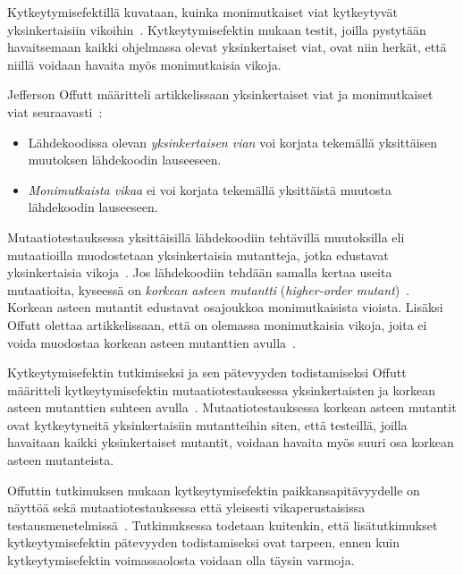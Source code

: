 \documentclass[finnish, grading]{tktltiki2}
\theoremstyle{definition}
\theoremstyle{remark}
\begin{document}
Kytkeytymisefektillä kuvataan, kuinka monimutkaiset viat kytkeytyvät yksinkertaisiin vikoihin~\cite[s. 35]{DeMillo:Lipton:Sayward:1978}. Kytkeytymisefektin mukaan testit, joilla pystytään havaitsemaan kaikki ohjelmassa olevat yksinkertaiset viat, ovat niin herkät, että niillä voidaan havaita myös monimutkaisia vikoja. 

Jefferson Offutt määritteli artikkelissaan yksinkertaiset viat ja monimutkaiset viat seuraavasti~\cite[s. 6]{Offutt:1992:Coupling}:
\begin{itemize}
  \item Lähdekoodissa olevan \textit{yksinkertaisen vian} voi korjata tekemällä yksittäisen muutoksen lähdekoodin lauseeseen.
  \item \textit{Monimutkaista vikaa} ei voi korjata tekemällä yksittäistä muutosta lähdekoodin lauseeseen.
\end{itemize}
Mutaatiotestauksessa yksittäisillä lähdekoodiin tehtävillä muutoksilla eli mutaatioilla muodostetaan yksinkertaisia mutantteja, jotka edustavat yksinkertaisia vikoja~\cite[s. 6]{Offutt:1992:Coupling}. Jos lähdekoodiin tehdään samalla kertaa useita mutaatioita, kyseessä on \textit{korkean asteen mutantti} (\textit{higher-order mutant})~\cite[s. 6]{Offutt:1992:Coupling}. Korkean asteen mutantit edustavat osajoukkoa monimutkaisista vioista. Lisäksi Offutt olettaa artikkelissaan, että on olemassa monimutkaisia vikoja, joita ei voida muodostaa korkean asteen mutanttien avulla~\cite[s. 6]{Offutt:1992:Coupling}.

Kytkeytymisefektin tutkimiseksi ja sen pätevyyden todistamiseksi Offutt määritteli kytkeytymisefektin mutaatiotestauksessa yksinkertaisten ja korkean asteen mutanttien suhteen avulla~\cite[s. 6]{Offutt:1992:Coupling}. Mutaatiotestauksessa korkean asteen mutantit ovat kytkeytyneitä yksinkertaisiin mutantteihin siten, että testeillä, joilla havaitaan kaikki yksinkertaiset mutantit, voidaan havaita myös suuri osa korkean asteen mutanteista. 

Offuttin tutkimuksen mukaan kytkeytymisefektin paikkansapitävyydelle on näyttöä sekä mutaatiotestauksessa että yleisesti vikaperustaisissa testausmenetelmissä~\cite[s. 6]{Offutt:1992:Coupling}. Tutkimuksessa todetaan kuitenkin, että lisätutkimukset kytkeytymisefektin pätevyyden todistamiseksi ovat tarpeen, ennen kuin kytkeytymisefektin voimassaolosta voidaan olla täysin varmoja.

\end{document}
